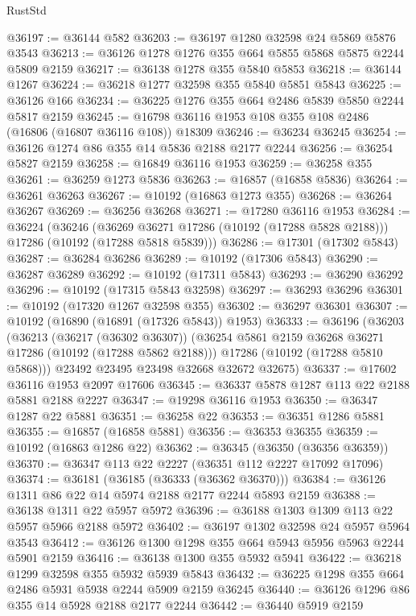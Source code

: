 \begin{lexlean}{RustStd}
\begin{coremodule}
@36197 := @36144 @582
@36203 := @36197 @1280 @32598 @24 @5869 @5876 @3543
@36213 := @36126 @1278 @1276 @355 @664 @5855 @5868 @5875 @2244 @5809 @2159
@36217 := @36138 @1278 @355 @5840 @5853
@36218 := @36144 @1267
@36224 := @36218 @1277 @32598 @355 @5840 @5851 @5843
@36225 := @36126 @166
@36234 := @36225 @1276 @355 @664 @2486 @5839 @5850 @2244 @5817 @2159
@36245 := @16798 @36116 @1953 @108 @355 @108 @2486 (@16806 (@16807 @36116 @108)) @18309
@36246 := @36234 @36245
@36254 := @36126 @1274 @86 @355 @14 @5836 @2188 @2177 @2244
@36256 := @36254 @5827 @2159
@36258 := @16849 @36116 @1953
@36259 := @36258 @355
@36261 := @36259 @1273 @5836
@36263 := @16857 (@16858 @5836)
@36264 := @36261 @36263
@36267 := @10192 (@16863 @1273 @355)
@36268 := @36264 @36267
@36269 := @36256 @36268
@36271 := @17280 @36116 @1953
@36284 := @36224
    (@36246
      (@36269 @36271 @17286 (@10192 (@17288 @5828 @2188)))
      @17286
      (@10192 (@17288 @5818 @5839)))
@36286 := @17301 (@17302 @5843)
@36287 := @36284 @36286
@36289 := @10192 (@17306 @5843)
@36290 := @36287 @36289
@36292 := @10192 (@17311 @5843)
@36293 := @36290 @36292
@36296 := @10192 (@17315 @5843 @32598)
@36297 := @36293 @36296
@36301 := @10192 (@17320 @1267 @32598 @355)
@36302 := @36297 @36301
@36307 := @10192 (@16890 (@16891 (@17326 @5843)) @1953)
@36333 := @36196
    (@36203
      (@36213
        (@36217 (@36302 @36307))
        (@36254 @5861 @2159 @36268 @36271 @17286 (@10192 (@17288 @5862 @2188)))
        @17286
        (@10192 (@17288 @5810 @5868)))
      @23492
      @23495
      @23498
      @32668
      @32672
      @32675)
@36337 := @17602 @36116 @1953 @2097 @17606
@36345 := @36337 @5878 @1287 @113 @22 @2188 @5881 @2188 @2227
@36347 := @19298 @36116 @1953
@36350 := @36347 @1287 @22 @5881
@36351 := @36258 @22
@36353 := @36351 @1286 @5881
@36355 := @16857 (@16858 @5881)
@36356 := @36353 @36355
@36359 := @10192 (@16863 @1286 @22)
@36362 := @36345 (@36350 (@36356 @36359))
@36370 := @36347 @113 @22 @2227 (@36351 @112 @2227 @17092 @17096)
@36374 := @36181 (@36185 (@36333 (@36362 @36370)))
@36384 := @36126 @1311 @86 @22 @14 @5974 @2188 @2177 @2244 @5893 @2159
@36388 := @36138 @1311 @22 @5957 @5972
@36396 := @36188 @1303 @1309 @113 @22 @5957 @5966 @2188 @5972
@36402 := @36197 @1302 @32598 @24 @5957 @5964 @3543
@36412 := @36126 @1300 @1298 @355 @664 @5943 @5956 @5963 @2244 @5901 @2159
@36416 := @36138 @1300 @355 @5932 @5941
@36422 := @36218 @1299 @32598 @355 @5932 @5939 @5843
@36432 := @36225 @1298 @355 @664 @2486 @5931 @5938 @2244 @5909 @2159 @36245
@36440 := @36126 @1296 @86 @355 @14 @5928 @2188 @2177 @2244
@36442 := @36440 @5919 @2159

\end{coremodule}
\end{lexlean}
